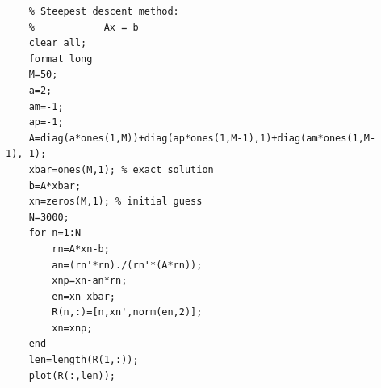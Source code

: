 \documentclass[11pt]{article}
\begin{document}
\newpage
\begin{Verbatim}
    % Steepest descent method:
    %            Ax = b
    clear all;
    format long
    M=50;
    a=2;
    am=-1;
    ap=-1;
    A=diag(a*ones(1,M))+diag(ap*ones(1,M-1),1)+diag(am*ones(1,M-1),-1);
    xbar=ones(M,1); % exact solution
    b=A*xbar;
    xn=zeros(M,1); % initial guess
    N=3000;
    for n=1:N
        rn=A*xn-b;
        an=(rn'*rn)./(rn'*(A*rn));
        xnp=xn-an*rn;
        en=xn-xbar;
        R(n,:)=[n,xn',norm(en,2)];
        xn=xnp;
    end
    len=length(R(1,:));
    plot(R(:,len));
\end{Verbatim}
\end{document}
